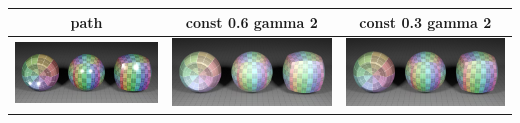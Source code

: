 \documentclass[11pt]{article}
\begin{document}
\begin{table}[ht]
  \centering
  \begin{tabular}{ | c | c | c |}
    \hline
    path & const 0.6 gamma 2 & const 0.3 gamma 2 \\ \hline
    \begin{minipage}{.3\textwidth}
      \includegraphics[scale=0.1]{img/obj/simple_al/simple_al.jpg}
    \end{minipage}
    &
    \begin{minipage}{.3\textwidth}
      \includegraphics[scale=0.1]{img/obj/simple_al/simple_al_disney.jpg}
    \end{minipage}
    & 
    \begin{minipage}{.3\textwidth}
      \includegraphics[scale=0.1]{img/obj/simple_al/simple_al_disney_dc03.jpg}
    \end{minipage}
    \\ \hline
  \end{tabular}
\end{table}
\end{document}

